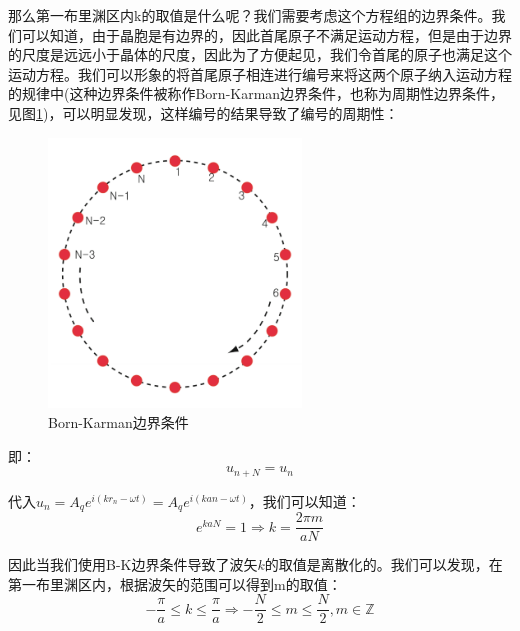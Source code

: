 \documentclass{ctexart}
\begin{document}
            那么第一布里渊区内k的取值是什么呢？我们需要考虑这个方程组的边界条件。我们可以知道，由于晶胞是有边界的，因此首尾原子不满足运动方程，但是由于边界的尺度是远远小于晶体的尺度，因此为了方便起见，我们令首尾的原子也满足这个运动方程。我们可以形象的将首尾原子相连进行编号来将这两个原子纳入运动方程的规律中(这种边界条件被称作Born-Karman边界条件，也称为周期性边界条件，见图\ref{fig:BKboundery})，可以明显发现，这样编号的结果导致了编号的周期性：
            \begin{figure}[H]
                \centering
                \includegraphics[width=0.6\textwidth]{figure/B-K边界条件.png}
                \caption{Born-Karman边界条件}
                \label{fig:BKboundery}
            \end{figure}
            
            即：
            \begin{equation}
                u_{n+N}=u_n
            \end{equation}
            
            代入$ u_n=A_q e^{i(kr_n-\omega t)}=A_q e^{i(k a n-\omega t)}$，我们可以知道：
            \begin{equation}
                e^{kaN}=1\Rightarrow k=\frac{2\pi m}{aN}
            \end{equation}
            
            因此当我们使用B-K边界条件导致了波矢$k$的取值是离散化的。我们可以发现，在第一布里渊区内，根据波矢的范围可以得到m的取值：
            \begin{equation}
                -\frac{\pi}{a}\leq k \leq\frac{\pi}{a}\Rightarrow -\frac{N}{2}\leq m\leq \frac{N}{2},m\in \mathbb{Z}
            \end{equation}
            
\end{document}

